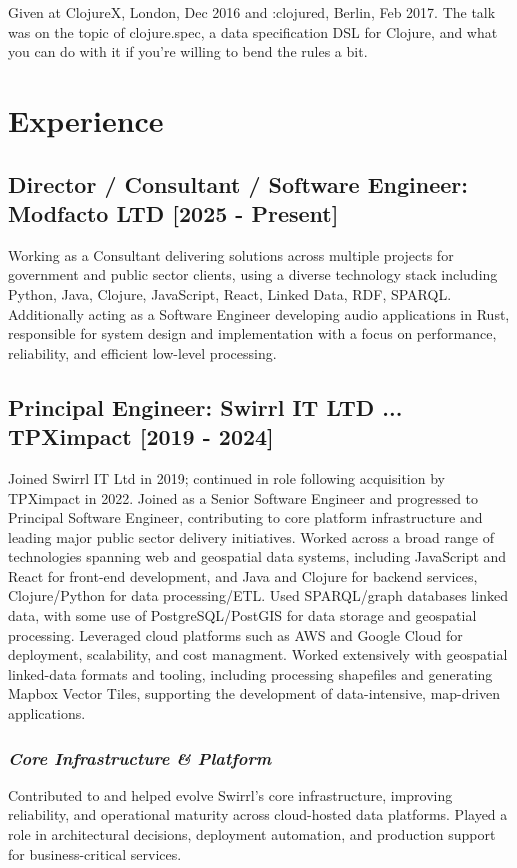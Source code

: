 \documentclass{article}
\begin{document}
Given at ClojureX, London, Dec 2016 and :clojured, Berlin, Feb 2017. The talk
was on the topic of clojure.spec, a data specification DSL for Clojure, and what
you can do with it if you're willing to bend the rules a bit.
\section*{Experience}
\subsection*{Director / Consultant / Software Engineer: Modfacto LTD [2025 - Present]}
Working as a Consultant delivering solutions across multiple projects for
      government and public sector clients, using a diverse technology stack
      including Python, Java, Clojure, JavaScript, React, Linked Data, RDF,
      SPARQL.
Additionally acting as a Software Engineer developing audio applications
      in Rust, responsible for system design and implementation with a focus on
      performance, reliability, and efficient low-level processing.
\subsection*{Principal Engineer: Swirrl IT LTD ... TPXimpact [2019 - 2024]}
Joined Swirrl IT Ltd in 2019; continued in role following acquisition by
     TPXimpact in 2022.
Joined as a Senior Software Engineer and progressed to Principal Software
     Engineer, contributing to core platform infrastructure and leading major
     public sector delivery initiatives.
Worked across a broad range of technologies spanning web and geospatial
      data systems, including JavaScript and React for front-end development,
      and Java and Clojure for backend services, Clojure/Python for data
      processing/ETL. Used SPARQL/graph databases linked data, with some use of
      PostgreSQL/PostGIS for data storage and geospatial processing. Leveraged
      cloud platforms such as AWS and Google Cloud for deployment, scalability,
      and cost managment. Worked extensively with geospatial linked-data formats
      and tooling, including processing shapefiles and generating Mapbox Vector
      Tiles, supporting the development of data-intensive, map-driven
      applications.
\subsubsection*{\emph{Core Infrastructure \& Platform}}
Contributed to and helped evolve Swirrl’s core infrastructure, improving
      reliability, and operational maturity across cloud-hosted data platforms.
      Played a role in architectural decisions, deployment automation, and
      production support for business-critical services.
\end{document}
